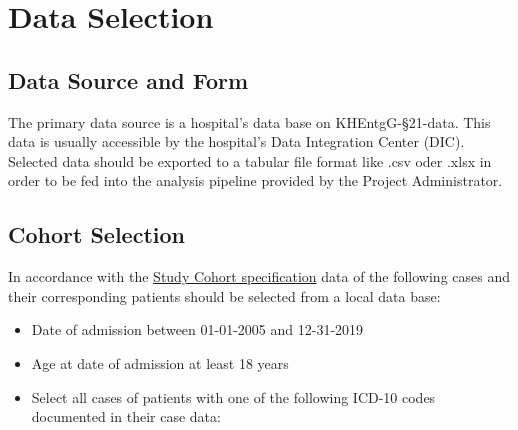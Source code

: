 \documentclass[
  letterpaper,
  DIV=11,
  numbers=noendperiod]{scrreprt}
\providecommand{\tightlist}{%
  \setlength{\itemsep}{0pt}\setlength{\parskip}{0pt}}\usepackage{longtable,booktabs,array}
\begin{document}
\hypertarget{data-selection}{%
\chapter{Data Selection}\label{data-selection}}

\hfill\break

\hypertarget{data-source-and-form}{%
\section{Data Source and Form}\label{data-source-and-form}}

The primary data source is a hospital's data base on KHEntgG-§21-data.
This data is usually accessible by the hospital's Data Integration
Center (DIC). Selected data should be exported to a tabular file format
like .csv oder .xlsx in order to be fed into the analysis pipeline
provided by the Project Administrator.

\hypertarget{cohort-selection}{%
\section{Cohort Selection}\label{cohort-selection}}

In accordance with the \protect\hyperlink{section-StudyCohort}{Study
Cohort specification} data of the following cases and their
corresponding patients should be selected from a local data base:

\begin{itemize}
\tightlist
\item
  Date of admission between 01-01-2005 and 12-31-2019
\item
  Age at date of admission at least 18 years
\item
  Select all cases of patients with one of the following ICD-10 codes
  documented in their case data:
\end{itemize}
\end{document}
